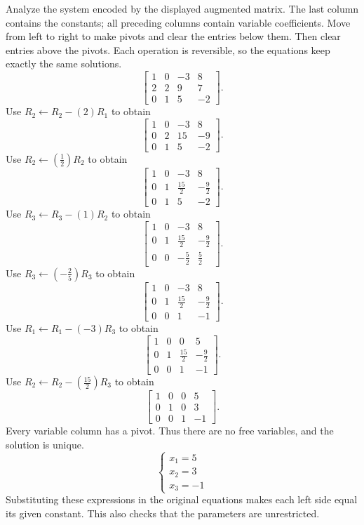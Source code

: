 \goal Analyze the system encoded by the displayed augmented matrix. The last column contains the constants; all preceding columns contain variable coefficients.
\idea Move from left to right to make pivots and clear the entries below them. Then clear entries above the pivots. Each operation is reversible, so the equations keep exactly the same solutions.
\[ \left[\begin{array}{rrr|r}1&0&-3&8\\2&2&9&7\\0&1&5&-2\end{array}\right].\]
Use $R_{2}\leftarrow R_{2}-(2)R_{1}$ to obtain
\[ \left[\begin{array}{rrr|r}1&0&-3&8\\0&2&15&-9\\0&1&5&-2\end{array}\right].\]
Use $R_{2}\leftarrow(\frac{1}{2})R_{2}$ to obtain
\[ \left[\begin{array}{rrr|r}1&0&-3&8\\0&1&\frac{15}{2}&- \frac{9}{2}\\0&1&5&-2\end{array}\right].\]
Use $R_{3}\leftarrow R_{3}-(1)R_{2}$ to obtain
\[ \left[\begin{array}{rrr|r}1&0&-3&8\\0&1&\frac{15}{2}&- \frac{9}{2}\\0&0&- \frac{5}{2}&\frac{5}{2}\end{array}\right].\]
Use $R_{3}\leftarrow(- \frac{2}{5})R_{3}$ to obtain
\[ \left[\begin{array}{rrr|r}1&0&-3&8\\0&1&\frac{15}{2}&- \frac{9}{2}\\0&0&1&-1\end{array}\right].\]
Use $R_{1}\leftarrow R_{1}-(-3)R_{3}$ to obtain
\[ \left[\begin{array}{rrr|r}1&0&0&5\\0&1&\frac{15}{2}&- \frac{9}{2}\\0&0&1&-1\end{array}\right].\]
Use $R_{2}\leftarrow R_{2}-(\frac{15}{2})R_{3}$ to obtain
\[ \left[\begin{array}{rrr|r}1&0&0&5\\0&1&0&3\\0&0&1&-1\end{array}\right].\]
Every variable column has a pivot. Thus there are no free variables, and the solution is unique.
\[ \begin{cases}x_{1}=5\\x_{2}=3\\x_{3}=-1\end{cases}\]
Substituting these expressions in the original equations makes each left side equal its given constant. This also checks that the parameters are unrestricted.

